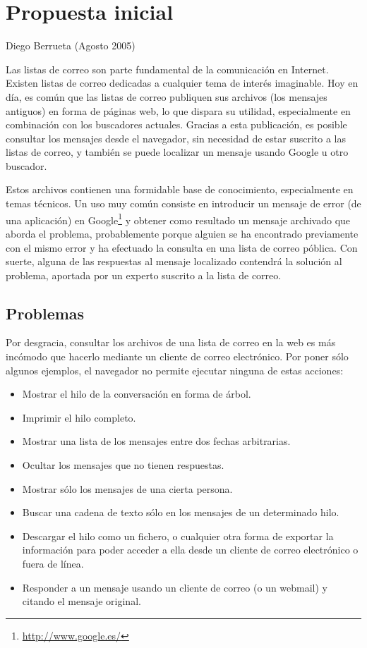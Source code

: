 
\chapter{Propuesta inicial\label{sec:propuesta}}

Diego Berrueta (Agosto 2005)

Las listas de correo son parte fundamental de la comunicación en Internet.
Existen listas de correo dedicadas a cualquier tema de inter\'es imaginable.
Hoy en día, es común que las listas de correo publiquen sus archivos (los
mensajes antiguos) en forma de páginas web, lo que dispara su utilidad,
especialmente en combinación con los buscadores actuales. Gracias a esta 
publicación, es posible consultar los mensajes desde el navegador, sin 
necesidad de estar suscrito a las listas de correo, y también se puede 
localizar un mensaje usando Google u otro buscador.

Estos archivos contienen una formidable base de conocimiento, especialmente
en temas técnicos. Un uso muy común consiste en introducir un mensaje de error 
(de una aplicación) en Google\footnote{\url{http://www.google.es/}} y obtener 
como resultado un mensaje archivado que aborda el problema, probablemente 
porque alguien se ha encontrado previamente con el mismo error y ha efectuado 
la consulta en una lista de correo póblica. Con suerte, alguna de las respuestas 
al mensaje localizado contendrá la solución al problema, aportada por un experto 
suscrito a la lista de correo.

\section*{Problemas}

Por desgracia, consultar los archivos de una lista de correo en la web es
más incómodo que hacerlo mediante un cliente de correo electrónico.
Por poner sólo algunos ejemplos, el navegador no permite ejecutar ninguna
de estas acciones:

\begin{itemize}
 \item Mostrar el hilo de la conversación en forma de árbol.
 \item Imprimir el hilo completo.
 \item Mostrar una lista de los mensajes entre dos fechas arbitrarias.
 \item Ocultar los mensajes que no tienen respuestas.
 \item Mostrar sólo los mensajes de una cierta persona.
 \item Buscar una cadena de texto sólo en los mensajes de un determinado hilo.
 \item Descargar el hilo como un fichero, o cualquier otra forma de exportar la
 información para poder acceder a ella desde un cliente de correo electrónico
 o fuera de línea.
 \item Responder a un mensaje usando un cliente de correo (o un webmail) y 
 citando el mensaje original.
\end{itemize}

